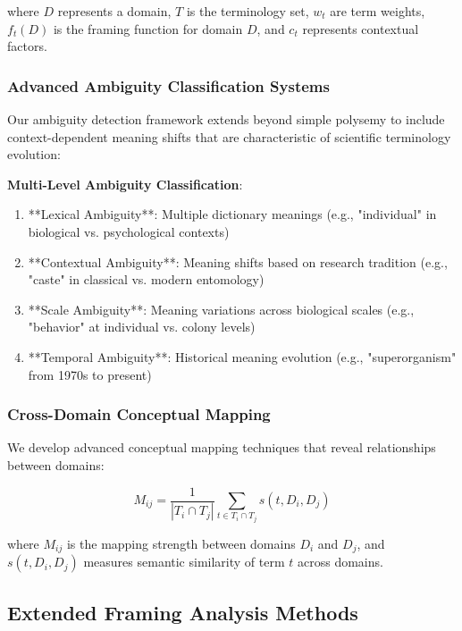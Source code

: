\documentclass[
]{article}
\numberwithin{equation}{section}
\begin{document}
where \(D\) represents a domain, \(T\) is the terminology set, \(w_t\)
are term weights, \(f_t(D)\) is the framing function for domain \(D\),
and \(c_t\) represents contextual factors.

\subsubsection{Advanced Ambiguity Classification
Systems}\label{advanced-ambiguity-classification-systems}

Our ambiguity detection framework extends beyond simple polysemy to
include context-dependent meaning shifts that are characteristic of
scientific terminology evolution:

\textbf{Multi-Level Ambiguity Classification}:

\begin{enumerate}
\item **Lexical Ambiguity**: Multiple dictionary meanings (e.g., "individual" in biological vs. psychological contexts)
\item **Contextual Ambiguity**: Meaning shifts based on research tradition (e.g., "caste" in classical vs. modern entomology)
\item **Scale Ambiguity**: Meaning variations across biological scales (e.g., "behavior" at individual vs. colony levels)
\item **Temporal Ambiguity**: Historical meaning evolution (e.g., "superorganism" from 1970s to present)
\end{enumerate}

\subsubsection{Cross-Domain Conceptual
Mapping}\label{cross-domain-conceptual-mapping}

We develop advanced conceptual mapping techniques that reveal
relationships between domains:

\begin{equation}\label{eq:cross_domain_mapping}
M_{ij} = \frac{1}{|T_i \cap T_j|} \sum_{t \in T_i \cap T_j} s(t, D_i, D_j)
\end{equation}

where \(M_{ij}\) is the mapping strength between domains \(D_i\) and
\(D_j\), and \(s(t, D_i, D_j)\) measures semantic similarity of term
\(t\) across domains.

\subsection{Extended Framing Analysis
Methods}\label{extended-framing-analysis-methods}
\end{document}
